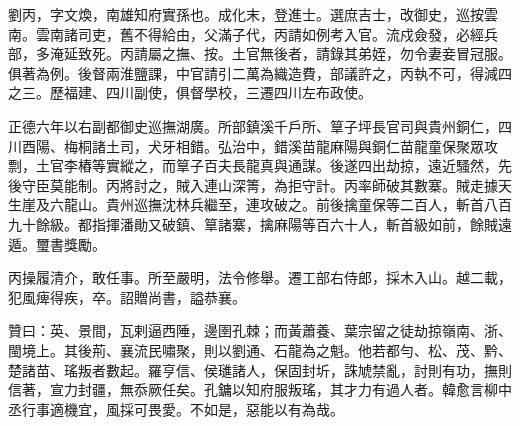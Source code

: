 \begin{pinyinscope}
劉丙，字文煥，南雄知府實孫也。成化末，登進士。選庶吉士，改御史，巡按雲南。雲南諸司吏，舊不得給由，父滿子代，丙請如例考入官。流戍僉發，必經兵部，多淹延致死。丙請屬之撫、按。土官無後者，請錄其弟姪，勿令妻妾冒冠服。俱著為例。後督兩淮鹽課，中官請引二萬為織造費，部議許之，丙執不可，得減四之三。歷福建、四川副使，俱督學校，三遷四川左布政使。

正德六年以右副都御史巡撫湖廣。所部鎮溪千戶所、筸子坪長官司與貴州銅仁，四川酉陽、梅桐諸土司，犬牙相錯。弘治中，錯溪苗龍麻陽與銅仁苗龍童保聚眾攻剽，土官李樁等實縱之，而筸子百夫長龍真與通謀。後遂四出劫掠，遠近騷然，先後守臣莫能制。丙將討之，賊入連山深箐，為拒守計。丙率師破其數寨。賊走據天生崖及六龍山。貴州巡撫沈林兵繼至，連攻破之。前後擒童保等二百人，斬首八百九十餘級。都指揮潘勛又破鎮、筸諸寨，擒麻陽等百六十人，斬首級如前，餘賊遠遁。璽書獎勵。

丙操履清介，敢任事。所至嚴明，法令修舉。遷工部右侍郎，採木入山。越二載，犯風痺得疾，卒。詔贈尚書，謚恭襄。

贊曰：英、景間，瓦剌逼西陲，邊圉孔棘；而黃蕭養、葉宗留之徒劫掠嶺南、浙、閩境上。其後荊、襄流民嘯聚，則以劉通、石龍為之魁。他若都勻、松、茂、黔、楚諸苗、瑤叛者數起。羅亨信、侯璡諸人，保固封圻，誅虓禁亂，討則有功，撫則信著，宣力封疆，無忝厥任矣。孔鏞以知府服叛瑤，其才力有過人者。韓愈言柳中丞行事適機宜，風採可畏愛。不如是，惡能以有為哉。


\end{pinyinscope}